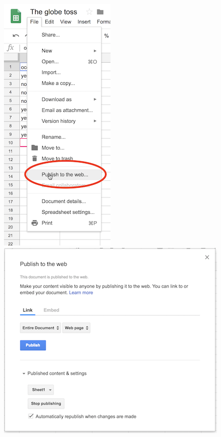 \documentclass[]{book}
\theoremstyle{definition}
\theoremstyle{definition}
\theoremstyle{definition}
\theoremstyle{remark}
\begin{document}
\includegraphics{images/publish1.png}~\includegraphics{images/publish2.png}
\end{document}
